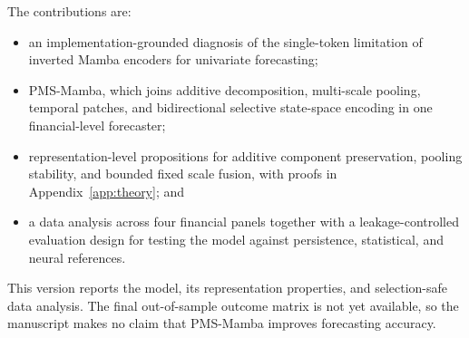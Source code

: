 The contributions are:
\begin{itemize}
    \item an implementation-grounded diagnosis of the single-token limitation of inverted Mamba encoders for univariate forecasting;
    \item PMS-Mamba, which joins additive decomposition, multi-scale pooling, temporal patches, and bidirectional selective state-space encoding in one financial-level forecaster;
    \item representation-level propositions for additive component preservation, pooling stability, and bounded fixed scale fusion, with proofs in Appendix~\ref{app:theory}; and
    \item a data analysis across four financial panels together with a leakage-controlled evaluation design for testing the model against persistence, statistical, and neural references.
\end{itemize}

This version reports the model, its representation properties, and selection-safe data analysis.
The final out-of-sample outcome matrix is not yet available, so the manuscript makes no claim that PMS-Mamba improves forecasting accuracy.
